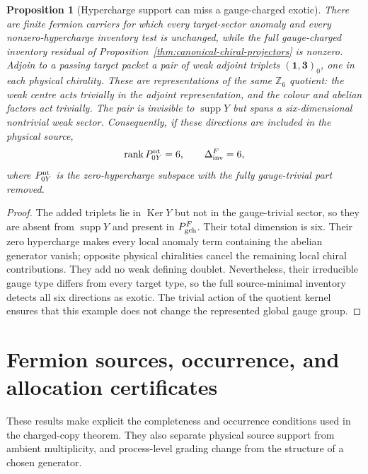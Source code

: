 \documentclass[11pt]{article}
\numberwithin{equation}{section}
\newtheorem{proposition}[theorem]{Proposition}
\theoremstyle{definition}
\theoremstyle{remark}
\newcommand{\Z}{\mathbb Z}
\newcommand{\rank}{\operatorname{rank}}
\newcommand{\Ker}{\operatorname{Ker}}
\begin{document}
\begin{proposition}[Hypercharge support can miss a gauge-charged exotic]
\label{cth:zero-hypercharge-exotic}
There are finite fermion carriers for which every target-sector anomaly and
every nonzero-hypercharge inventory test is unchanged, while the full
gauge-charged inventory residual of
Proposition~\ref{thm:canonical-chiral-projectors} is nonzero.  Adjoin to a passing
target packet a pair of weak adjoint triplets $(\mathbf1,\mathbf3)_0$,
one in each physical chirality.  These are representations of the same
$\Z_6$ quotient: the weak centre acts trivially in the adjoint representation,
and the colour and abelian factors act trivially.  The pair is invisible to
$\operatorname{supp}Y$ but spans a six-dimensional nontrivial weak sector.
Consequently, if these directions are included in the physical source,
\begin{equation}
 \rank P_{0Y}^{\rm nt}=6,\qquad \Delta_{\rm inv}^F=6,
 \label{eq:zero-hypercharge-exotic-gap}
\end{equation}
where $P_{0Y}^{\rm nt}$ is the zero-hypercharge subspace with the fully
gauge-trivial part removed.
\end{proposition}

\begin{proof}
The added triplets lie in $\Ker Y$ but not in the gauge-trivial sector, so
they are absent from $\operatorname{supp}Y$ and present in $P_{\rm gch}^F$.
Their total dimension is six.  Their zero hypercharge makes every local
anomaly term containing the abelian generator vanish; opposite physical
chiralities cancel the remaining local chiral contributions.  They add no
weak defining doublet.  Nevertheless, their irreducible gauge type differs
from every target type, so the full source-minimal inventory detects all six
directions as exotic.  The trivial action of the quotient kernel ensures
that this example does not change the represented global gauge group.
\end{proof}


\section{Fermion sources, occurrence, and allocation certificates}
\label{app:fermion-source}

These results make explicit the completeness and occurrence conditions
used in the charged-copy theorem.  They also separate physical source
support from ambient multiplicity, and process-level grading change from
the structure of a chosen generator.
\end{document}
